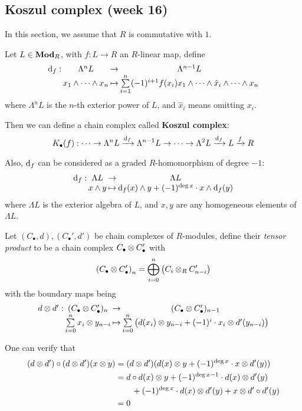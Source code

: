 \subsection{Koszul complex (week 16)}

\begin{remark}
  In this section, we assume that $R$ is commutative with $1$.
\end{remark}

\begin{definition}
  Let $L \in \mathbf{Mod}_R$, with $f: L \to R$ an $R$-linear map, define
  $$\deffunc{\df}{\Lambda^n L}{\Lambda^{n-1} L}{x_1 \we \cdots \we x_n}
  {\sum\limits_{i=1}^n (-1)^{i+1} f(x_i) x_1 \we \cdots \we \hat{x}_i \we
  \cdots \we x_n}$$
  where $\Lambda^n L$ is the $n$-th exterior power of $L$, and $\hat{x}_i$ means
  omitting $x_i$.

  Then we can define a chain complex called {\bf Koszul complex}:
  $$K_\bullet(f) : \cdots \to \Lambda^n L \xrightarrow{\mathrm{d}_f} \Lambda^{n-1} L \to \cdots \to
  \Lambda^2 L \xrightarrow{\mathrm{d}_f} L \xrightarrow{f} R$$

  Also, $\mathrm{d}_f$ can be considered as a graded $R$-homomorphism of degree $-1$:
  $$\deffunc{\df}{\Lambda L}{\Lambda L}{x \we y}
  {\df(x) \we y + (-1)^{\deg x}\cdot x \we \df(y)}$$
  where $\Lambda L$ is the exterior algebra of $L$, and $x, y$ are any homogeneous 
  elements of $\Lambda L$.
\end{definition}

\begin{definition}
  Let $(C_\bullet, d), (C_\bullet', d')$ be chain complexes of $R$-modules, 
  define their {\it tensor product} to be a chain complex $C_\bullet \otimes C_\bullet'$ with
  $$\left( C_\bullet \otimes C_\bullet' \right)_n = 
  \bigoplus\limits_{i=0}^n \left( C_i \otimes_R C_{n-i}' \right)$$
  with the boundary maps being
  $$\deffunc{d \Ot d'}{(C_\bullet \Ot C_\bullet')_n}{(C_\bullet \Ot C_\bullet')_{n-1}}
  {\sum\limits_{i=0}^n x_i \Ot y_{n-i}}{\sum\limits_{i=0}^n 
  \left( d(x_i) \Ot y_{n-i} + (-1)^i \cdot x_i \Ot d'(y_{n-i}) \right)}$$

  One can verify that 
  \begin{align*}
    (d \otimes d') \circ (d \otimes d') (x \otimes y) 
    &= (d \otimes d') (d(x) \otimes y + (-1)^{\deg x} \cdot x \otimes d'(y)) \\
    &= d \circ d (x) \otimes y + (-1)^{\deg x - 1} \cdot d(x) \otimes d'(y) \\
    &\qquad + (-1)^{\deg x} \cdot d(x) \otimes d'(y) + x \otimes d' \circ d'(y) \\
    &= 0
  \end{align*}
\end{definition}

